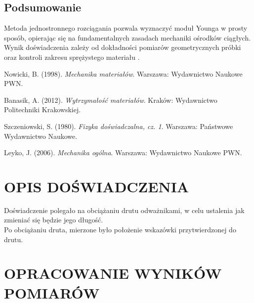 \documentclass{article}
\begin{document}
{\subsection*{Podsumowanie}
Metoda jednostronnego rozciągania pozwala wyznaczyć moduł Younga w prosty sposób, opierając się na fundamentalnych zasadach mechaniki ośrodków ciągłych. Wynik doświadczenia zależy od dokładności pomiarów geometrycznych próbki oraz kontroli zakresu sprężystego materiału \cite{nowicki}.

\begin{thebibliography}{9}
Nowicki, B. (1998). \emph{Mechanika materiałów}. Warszawa: Wydawnictwo Naukowe PWN.

Banasik, A. (2012). \emph{Wytrzymałość materiałów}. Kraków: Wydawnictwo Politechniki Krakowskiej.

Szczeniowski, S. (1980). \emph{Fizyka doświadczalna, cz. 1}. Warszawa: Państwowe Wydawnictwo Naukowe.

Leyko, J. (2006). \emph{Mechanika ogólna}. Warszawa: Wydawnictwo Naukowe PWN.
\end{thebibliography}
}

\section*{OPIS DOŚWIADCZENIA}

{Doświadczenie polegało na obciążaniu drutu odważnikami, w celu ustalenia jak zmieniać się będzie jego długość. \\
Po obciążaniu druta, mierzone było położenie wskazówki przytwierdzonej do drutu.

}

\section*{OPRACOWANIE WYNIKÓW POMIARÓW}
\end{document}
